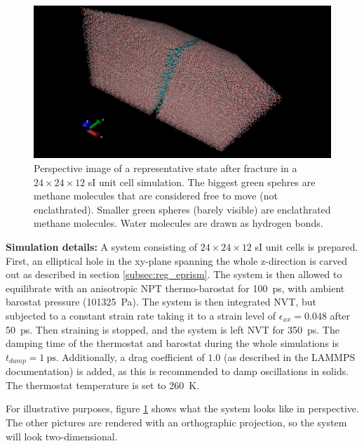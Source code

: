 \begin{figure}
\includegraphics[width=\textwidth]{../pictures/system_1048.pdf}
\caption{Perspective image of a representative state after fracture in a $24\times 24 \times 12$ sI unit cell simulation. The biggest green spehres are methane molecules that are considered free to move (not enclathrated). Smaller green spheres (barely visible) are enclathrated methane molecules. Water molecules are drawn as hydrogen bonds.}
\label{fig:system_1048}
\end{figure}

\begin{framed} 
\textbf{Simulation details:} A system consisting of $24 \times 24\times 12$ sI unit cells is prepared. First, an elliptical hole in the xy-plane spanning the whole z-direction is carved out as described in section \ref{subsec:reg_eprism}. The system is then allowed to equilibrate with an anisotropic NPT thermo-barostat for \SI{100}{\pico\second}, with ambient barostat pressure (\SI{101325}{\pascal}). The system is then integrated NVT, but subjected to a constant strain rate taking it to a strain level of $\epsilon_{xx} = 0.048$ after \SI{50}{\pico\second}. Then straining is stopped, and the system is left NVT for \SI{350}{\pico\second}. The damping time of the thermostat and barostat during the whole simulations is $t_{damp} = \SI{1}{\ps}$. Additionally, a drag coefficient of $1.0$ (as described in the LAMMPS documentation) is added, as this is recommended to damp oscillations in solids. The thermostat temperature is set to \SI{260}{\kelvin}.
\end{framed}

For illustrative purposes, figure \ref{fig:system_1048} shows what the system looks like in perspective. The other pictures are rendered with an orthographic projection, so the system will look two-dimensional. 

